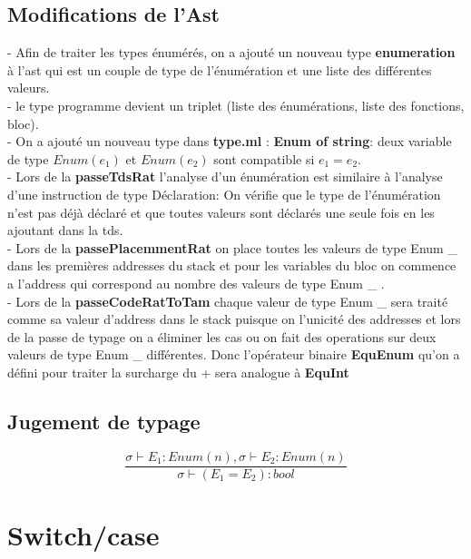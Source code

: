 \documentclass{article}
\begin{document}
\subsection{Modifications de l'Ast}
- Afin de traiter les types énumérés, on a ajouté un nouveau type \textbf{enumeration} à l'ast qui est un couple de type de l'énumération et une liste des différentes
valeurs. \\
- le type programme devient un triplet (liste des énumérations, liste des fonctions, bloc). \\
- On a ajouté un nouveau type dans \textbf{type.ml} : \textbf{Enum of string}: deux variable de type 
$Enum (e_1)$ et $Enum (e_2)$ sont compatible si $e_1 = e_2$. \\
- Lors de la \textbf{passeTdsRat} l'analyse d'un énumération est similaire à l'analyse d'une instruction de type Déclaration: On vérifie que le type 
de l'énumération n'est pas déjà déclaré et que toutes valeurs sont déclarés une seule fois en les ajoutant dans la tds.\\
- Lors de la \textbf{passePlacemmentRat} on place toutes les valeurs de type Enum \_ dans les premières addresses du stack et pour les variables du bloc on 
commence a l'address qui correspond au nombre des valeurs de type Enum \_ . \\ 
- Lors de la \textbf{passeCodeRatToTam} chaque valeur de type Enum \_ sera traité comme sa valeur d'address dans le stack puisque on l'unicité des addresses et lors de 
la passe de typage on a éliminer les cas ou on fait des operations sur deux valeurs de type Enum \_ différentes. Donc l'opérateur binaire \textbf{EquEnum} qu'on a défini pour
traiter la surcharge du + sera analogue à \textbf{EquInt}
\subsection{Jugement de typage}
\begin{equation}
    \frac{\sigma \vdash E_1 : Enum(n), \sigma \vdash E_2 : Enum(n)}{\sigma \vdash (E_1=E_2) : bool}
\end{equation}
\section{Switch/case}
\end{document}
